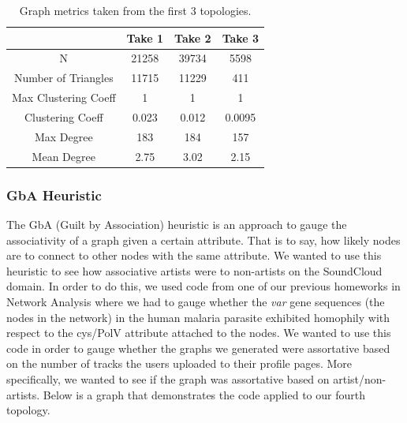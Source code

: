 \documentclass{article}
\begin{document}
\begin{table}[h!]
	\centering
	\begin{tabular}{||c c c c||} 
		\hline
		& Take 1 & Take 2 & Take 3\\ [0.5ex] 
		\hline\hline
		N & 21258 & 39734 & 5598 \\
		\hline
		Number of Triangles & 11715 & 11229 & 411 \\ 
		\hline
		Max Clustering Coeff & 1 & 1 & 1 \\
		\hline
		Clustering Coeff & 0.023 & 0.012 & 0.0095 \\
		\hline
		Max Degree & 183 & 184 & 157 \\
		\hline
		Mean Degree & 2.75 & 3.02 & 2.15 \\
		\hline
	\end{tabular}
	\caption{Graph metrics taken from the first 3 topologies. }
	\label{Table:2}
\end{table}

\subsubsection{GbA Heuristic}
The GbA (Guilt by Association) heuristic is an approach to gauge the associativity of a graph given a certain attribute.  That is to say, how likely nodes are to connect to other nodes with the same attribute.  We wanted to use this heuristic to see how associative artists were to non-artists on the SoundCloud domain. In order to do this, we used code from one of our previous homeworks in Network Analysis where we had to gauge whether the \textit{var} gene sequences (the nodes in the network) in the human malaria parasite exhibited homophily with respect to the cys/PolV attribute attached to the nodes.  We wanted to use this code in order to gauge whether the graphs we generated were assortative based on the number of tracks the users uploaded to their profile pages.  More specifically, we wanted to see if the graph was assortative based on artist/non-artists. Below is a graph that demonstrates the code applied to our fourth topology.
\end{document}
